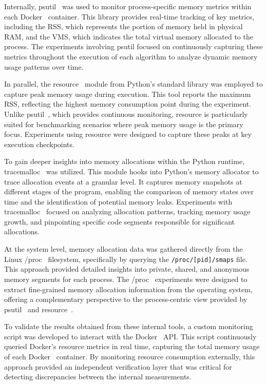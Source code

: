 Internally, psutil~\cite{psutil} was used to monitor process-specific memory metrics within each Docker~\cite{docker} container.
This library provides real-time tracking of key metrics, including the \ac{RSS}, which represents the portion of memory held in physical RAM, and the \ac{VMS}, which indicates the total virtual memory allocated to the process.
The experiments involving psutil focused on continuously capturing these metrics throughout the execution of each algorithm to analyze dynamic memory usage patterns over time.

In parallel, the resource~\cite{importlib_resources} module from Python’s standard library was employed to capture peak memory usage during execution.
This tool reports the maximum \ac{RSS}, reflecting the highest memory consumption point during the experiment.
Unlike psutil~\cite{psutil}, which provides continuous monitoring, resource is particularly suited for benchmarking scenarios where peak memory usage is the primary focus.
Experiments using resource were designed to capture these peaks at key execution checkpoints.

To gain deeper insights into memory allocations within the Python runtime, tracemalloc~\cite{tracemalloc} was utilized.
This module hooks into Python’s memory allocator to trace allocation events at a granular level.
It captures memory snapshots at different stages of the program, enabling the comparison of memory states over time and the identification of potential memory leaks.
Experiments with tracemalloc~\cite{tracemalloc} focused on analyzing allocation patterns, tracking memory usage growth, and pinpointing specific code segments responsible for significant allocations.

At the system level, memory allocation data was gathered directly from the Linux /proc~\cite{procfs} filesystem, specifically by querying the \texttt{/proc/[pid]/smaps} file.
This approach provided detailed insights into private, shared, and anonymous memory segments for each process.
The /proc~\cite{procfs} experiments were designed to extract fine-grained memory allocation information from the operating system, offering a complementary perspective to the process-centric view provided by psutil~\cite{psutil} and resource~\cite{importlib_resources}.

To validate the results obtained from these internal tools, a custom monitoring script was developed to interact with the Docker~\cite{docker} API.
This script continuously queried Docker’s resource metrics in real time, capturing the total memory usage of each Docker~\cite{docker} container.
By monitoring resource consumption externally, this approach provided an independent verification layer that was critical for detecting discrepancies between the internal measurements.

